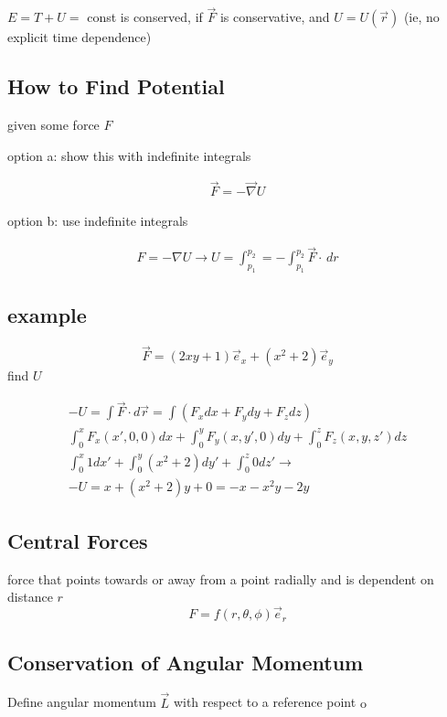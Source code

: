 \documentclass[fleqn]{report}
\newcommand{\equations} [1] {
\begin{gather*}
#1
\end{gather*}
}
\begin{document}
$E = T + U =$ const is conserved, if $\vec F$ is conservative, and 
$U = U(\vec r)$ (ie, no explicit time dependence)

\subsection{How to Find Potential}
given some force $F$

option a: show this with indefinite integrals
\equations{
	\vec F = - \vec \nabla U
}


option b: use indefinite integrals
\equations{
	F = - \nabla U 
	\rightarrow U = \int^{p_2}_{p_1} = -\int^{p_2}_{p_1} \vec F \cdot \, dr
}

\subsection{example}
\[
	\vec F = (2xy + 1) \vec e_x + 
	(x^2 + 2) \vec e_y
\]
find $U$

\equations{
	-U = \int \vec F \cdot d \vec r = 
	\int (F_x dx + F_y dy + F_z dz)
	\\
	\int^x_0 F_x(x', 0, 0) dx + \int^y_0 F_y(x, y', 0) dy + \int^z_0 F_z(x,y, z') dz
	\\
	\int^x_0 1 dx' + \int^y_0 (x^2 + 2) dy' + \int^z_0 0 dz'
	\rightarrow
	\\
	-U = x + (x^2 + 2)y + 0 =
	-x - x^2y - 2y
}

\subsection{Central Forces}
force that points towards or away from a point radially and is dependent on distance $r$
\[
	F = f(r, \theta, \phi) \vec e_r
\]

\subsection{Conservation of Angular Momentum}
Define angular momentum $\vec L$ with respect to a reference point $\mathrm{o}$
\end{document}
